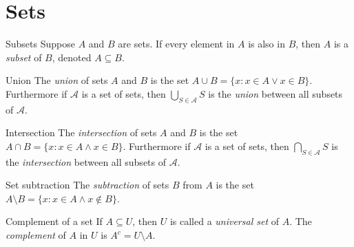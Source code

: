 \documentclass{report}
\begin{document}
\chapter{Sets}


\begin{definition}{Subsets}{}
  Suppose $A$ and $B$ are sets. If every element in $A$ is also in $B$, then $A$ is a \emph{subset} of $B$, denoted $A \subseteq B$.
\end{definition}

\begin{definition}{Union}{}
  The \emph{union} of sets $A$ and $B$ is the set $A \cup B = \{x : x \in A \lor x \in B\}$.
  Furthermore if $\mathscr{A}$ is a set of sets, then $\bigcup_{S \in \mathscr{A}} S$ is the \emph{union} between all subsets of $\mathscr{A}$.
\end{definition}

\begin{definition}{Intersection}{}
  The \emph{intersection} of sets $A$ and $B$ is the set $A \cap B = \{x : x \in A \land x \in B\}$.
  Furthermore if $\mathscr{A}$ is a set of sets, then $\bigcap_{S \in \mathscr{A}} S$ is the \emph{intersection} between all subsets of $\mathscr{A}$.
\end{definition}

\begin{definition}{Set subtraction}{}
  The \emph{subtraction} of sets $B$ from $A$ is the set $A \setminus B = \{x : x \in A \land x \notin B\}$.
\end{definition}

\begin{definition}{Complement of a set}{}
  If $A \subseteq U$, then $U$ is called a \emph{universal set} of $A$.
  The \emph{complement} of $A$ in $U$ is $A^c = U \setminus A$.

\end{definition}
\end{document}

